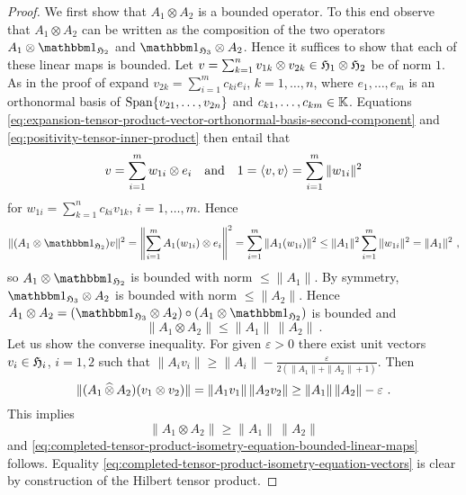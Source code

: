 \begin{proof}
  We first show that $A_1 \otimes A_2 $ is a bounded operator. To this end observe that
  $A_1 \otimes A_2 $ can be written as the composition of the two operators $A_1\otimes \idn_{\hilbertH_2}$
  and $ \idn_{\hilbertH_3} \otimes A_2$. Hence it suffices to show that each of these linear maps is bounded.
  Let $v = \sum_{k=1}^n v_{1k} \otimes v_{2k} \in \mathfrak{H}_1 \otimes \mathfrak{H}_2$ be of norm $1$.
  As in the proof of   expand 
  $ v_{2k} = \sum_{i=1}^m c_{ki} e_i$, $k=1,\ldots ,n$, where $e_1, \ldots , e_m$ is an orthonormal basis of
  $\operatorname{Span} \{ v_{21}, \ldots , v_{2n}\}$  and $c_{k1}, \ldots , c_{km} \in \mathbb{K}$. 
  Equations \eqref{eq:expansion-tensor-product-vector-orthonormal-basis-second-component}
  and \eqref{eq:positivity-tensor-inner-product} then entail that
  \begin{displaymath}
    v = \sum_{i=1}^m  w_{1i}  \otimes  e_i \quad\text{and}\quad
    1  = \langle v,v \rangle  = \sum_{i=1}^m \| w_{1i} \|^2 
  \end{displaymath}
  for $ w_{1i} = \sum_{k=1}^n   c_{ki} v_{1k} $, $i=1,\ldots , m$.
  Hence
  \[
    \|( A_1 \otimes \idn_{\hilbertH_2})v \|^2 =  \left\| \sum_{i=1}^m A_1 (w_{1i}) \otimes e_i\right\|^2
    = \sum_{i=1}^m \| A_1 (w_{1i}) \|^2 \leq \|A_1\|^2 \sum_{i=1}^m \| w_{1i} \|^2  = \|A_1\|^2  \ ,
  \]
  so $A_1\otimes \idn_{\hilbertH_2}$ is bounded with norm $\leq \|A_1\|$.
  By symmetry,  $ \idn_{\hilbertH_3} \otimes A_2$ is  bounded with norm $\leq \|A_2\|$. Hence
  $A_1 \otimes A_2 = (\idn_{\hilbertH_3} \otimes A_2 )\circ (A_1\otimes \idn_{\hilbertH_2}) $
  is bounded and
  \[
    \| A_1 \otimes A_2 \| \leq \|A_1\| \, \|A_2\| \ .
  \] 
  Let us show the converse inequality. For given $\varepsilon >0$ there exist
  unit vectors $v_i \in \mathfrak{H}_i$, $i=1,2$ such that
  $\|A_iv_i \|\geq \| A_i \| - \frac{\varepsilon}{2(\| A_1\| +\|A_2\| +1)}$. Then
  \[
    \| (A_1 {\,\widehat{\otimes}\,} A_2) (v_1\otimes v_2) \| =   \| A_1v_1\| \,  \| A_2v_2\|
    \geq \| A_1 \| \, \| A_2\| -  \varepsilon \ .
  \]
  This implies 
  \[
    \| A_1 \otimes A_2 \| \geq \|A_1\| \, \|A_2\| 
  \]
  and \eqref{eq:completed-tensor-product-isometry-equation-bounded-linear-maps} follows.
  Equality \eqref{eq:completed-tensor-product-isometry-equation-vectors} is clear by
  construction of the Hilbert tensor product.


\end{proof}
